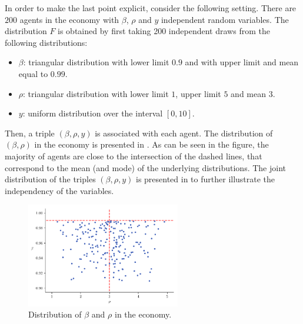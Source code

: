 \documentclass[english, a4paper,12pt]{article}
\begin{document}
In order to make the last point explicit, consider the following setting. There are $200$ agents in the economy with $\beta$, $\rho$ and $y$ independent random variables. The distribution $F$ is obtained by first taking 200 independent draws from the following distributions:
	\begin{itemize}
		\item $\beta$: triangular distribution with lower limit $0.9$ and with upper limit and mean equal to $0.99$.
		\item $\rho$: triangular distribution with lower limit $1$, upper limit $5$ and mean $3$.
		\item $y$: uniform distribution over the interval $[0,10]$. 
	\end{itemize}
Then, a triple $(\beta,\rho,y)$ is associated with each agent. The distribution of $(\beta,\rho)$ in the economy is presented in . As can be seen in the figure, the majority of agents are close to the intersection of the dashed lines, that correspond to the mean (and mode) of the underlying distributions. The joint distribution of the triples $(\beta,\rho,y)$ is presented in  to further illustrate the independency of the variables.
	\begin{figure}[H]
		\caption{Distribution of $\beta$ and $\rho$ in the economy.}
		\label{fig:distribBetaRho}
		\includegraphics[width=0.6\textwidth]{CarrollDistrib}
	\end{figure}
\end{document}
